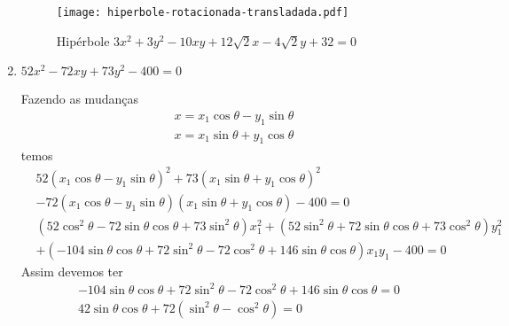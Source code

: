 \begin{exemplos}
\begin{enumerate}
\begin{solucao}
\begin{figure}[!h]
        \caption{Hip\'erbole $3x^2 +3y^2 - 10xy + 12\sqrt{2}x - 4\sqrt{2}y + 32 = 0$}
        \texttt{[image: hiperbole-rotacionada-transladada.pdf]}
      \end{figure}
    \end{solucao}
    \item $52x^2 - 72xy + 73y^2 - 400 = 0$
    \begin{solucao}
      Fazendo as mudan\c{c}as
      \begin{align}
        x = x_1\cos\theta - y_1\sin\theta\\
        x = x_1\sin\theta + y_1\cos\theta
      \end{align}
      temos
      \begin{align}\label{conicaelipse}
        &52(x_1\cos\theta - y_1\sin\theta)^2 + 73(x_1\sin\theta + y_1\cos\theta)^2\nonumber \\ &- 72(x_1\cos\theta - y_1\sin\theta)(x_1\sin\theta + y_1\cos\theta) - 400 = 0\nonumber\\ &(52\cos^2\theta - 72\sin\theta\cos\theta + 73\sin^2\theta)x_1^2 + (52\sin^2\theta + 72\sin\theta\cos\theta + 73\cos^2\theta)y_1^2 \nonumber\\&+ (-104\sin\theta\cos\theta + 72\sin^2\theta - 72\cos^2\theta + 146\sin\theta\cos\theta)x_1y_1 - 400 = 0
      \end{align}
      Assim devemos ter
      \begin{align*}
        &-104\sin\theta\cos\theta + 72\sin^2\theta - 72\cos^2\theta + 146\sin\theta\cos\theta = 0\\
        &42\sin\theta\cos\theta + 72(\sin^2\theta - \cos^2\theta) = 0\\

\end{align*}
\end{solucao}
\end{enumerate}
\end{exemplos}
